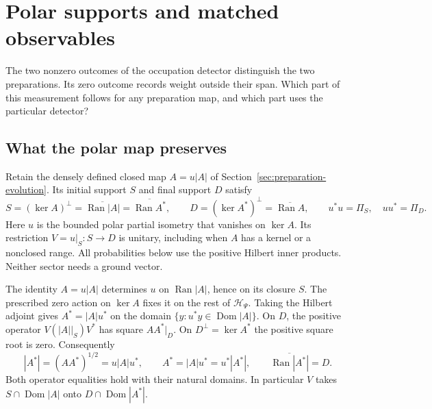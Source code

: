 \documentclass[11pt]{article}
\theoremstyle{definition}
\DeclareMathOperator{\Ran}{Ran}
\begin{document}
\section{Polar supports and matched observables}
\label{sec:polar-matched-observables}

The two nonzero outcomes of the occupation detector distinguish the two preparations. Its zero outcome records weight outside their span. Which part of this measurement follows for any preparation map, and which part uses the particular detector?

\subsection{What the polar map preserves}

Retain the densely defined closed map $A=u|A|$ of Section~\ref{sec:preparation-evolution}. Its initial support $S$ and final support $D$ satisfy
\begin{equation}
 S=(\ker A)^\perp=\overline{\Ran |A|}=\overline{\Ran A^*},\qquad
 D=(\ker A^*)^\perp=\overline{\Ran A},\qquad
 u^*u=\Pi_S,\quad uu^*=\Pi_D .
 \label{eq:polar-active-supports}
\end{equation}
Here $u$ is the bounded polar partial isometry that vanishes on $\ker A$. Its restriction $V=u|_S:S\to D$ is unitary, including when $A$ has a kernel or a nonclosed range. All probabilities below use the positive Hilbert inner products. Neither sector needs a ground vector.

The identity $A=u|A|$ determines $u$ on $\Ran|A|$, hence on its closure $S$. The prescribed zero action on $\ker A$ fixes it on the rest of $\mathcal H_\Psi$. Taking the Hilbert adjoint gives $A^*=|A|u^*$ on the domain $\{y:u^*y\in\operatorname{Dom}|A|\}$. On $D$, the positive operator $V(|A|\vert_S)V^*$ has square $AA^*\vert_D$. On $D^\perp=\ker A^*$ the positive square root is zero. Consequently
\begin{equation}
 |A^*|=(AA^*)^{1/2}=u|A|u^*,\qquad
 A^*=|A|u^*=u^*|A^*|,\qquad \overline{\Ran|A^*|}=D .
 \label{eq:channel-polar-intertwining}
\end{equation}
Both operator equalities hold with their natural domains. In particular $V$ takes $S\cap\operatorname{Dom}|A|$ onto $D\cap\operatorname{Dom}|A^*|$.
\end{document}
